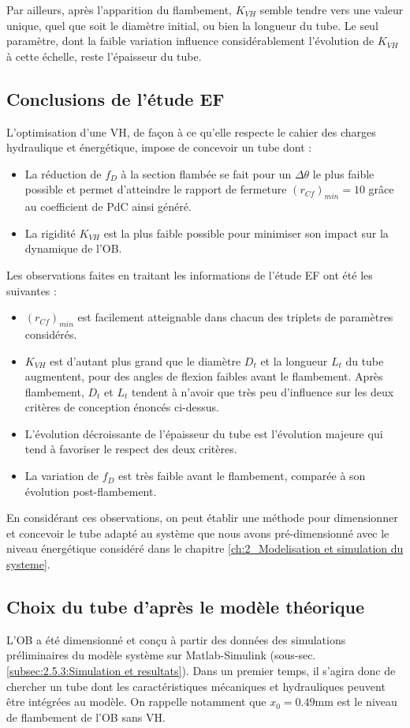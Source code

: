 Par ailleurs, après l'apparition du flambement, $K_{VH}$ semble tendre vers une valeur unique, quel que soit le diamètre initial, ou bien la longueur du tube. Le seul paramètre, dont la faible variation influence considérablement l'évolution de $K_{VH}$ à cette échelle, reste l'épaisseur du tube. 
	\subsection{Conclusions de l'étude EF}
L'optimisation d'une VH, de façon à ce qu'elle respecte le cahier des charges hydraulique et énergétique, impose de concevoir un tube dont :
\begin{itemize}[label=$\circ$]
	\item La réduction de $f_D$ à la section flambée se fait pour un $\Delta \theta$ le plus faible possible et permet d'atteindre le rapport de fermeture $(r_{Cf})_{min}=10$ grâce au coefficient de PdC ainsi généré.
	\item La rigidité $K_{VH}$ est la plus faible possible pour minimiser son impact sur la dynamique de l'OB.
\end{itemize}
Les observations faites en traitant les informations de l'étude EF ont été les suivantes :
\begin{itemize}[label=$\bullet$] 
	\item $(r_{Cf})_{min}$ est facilement atteignable dans chacun des triplets de paramètres considérés.
	\item $K_{VH}$ est d'autant plus grand que le diamètre $D_t$ et la longueur $L_t$ du tube augmentent, pour des angles de flexion faibles avant le flambement. Après flambement, $D_t$ et $L_t$ tendent à n'avoir que très peu d'influence sur les deux critères de conception énoncés ci-dessus.
	\item L'évolution décroissante de l'épaisseur du tube est l'évolution majeure qui tend à favoriser le respect des deux critères. 
	\item La variation de $f_D$ est très faible avant le flambement, comparée à son évolution post-flambement.
\end{itemize}
En considérant ces observations, on peut établir une méthode pour dimensionner et concevoir le tube adapté au système que nous avons pré-dimensionné avec le niveau énergétique considéré dans le chapitre \ref{ch:2_Modelisation et simulation du systeme}.
	\subsection{Choix du tube d'après le modèle théorique}
	\label{sec:5.2.4_Choix du tube d apres le modele theorique}
L'OB a été dimensionné et conçu à partir des données des simulations préliminaires du modèle système sur Matlab-Simulink (sous-sec. \ref{subsec:2.5.3:Simulation et resultats}). Dans un premier temps, il s'agira donc de chercher un tube dont les caractéristiques mécaniques et hydrauliques peuvent être intégrées au modèle. On rappelle notamment que $x_0=0.49$mm est le niveau de flambement de l'OB sans VH.

